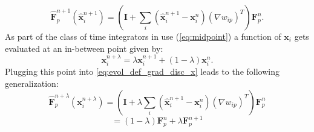 \documentclass[m,times]{cgMA}
\begin{document}
\begin{equation}\label{eq:evol_def_grad_disc_x}
  \boldsymbol{\hat{F}}^{n+1}_p(\boldsymbol{\hat{x}}_i^{n+1}) =  \left( \boldsymbol{I} + \sum_i (\boldsymbol{\hat{x}}_i^{n+1} - \boldsymbol{x}_i^{n})({\nabla w_{ip}})^T \right)\boldsymbol{F}^{n}_p.
\end{equation}
As part of the class of time integrators in use (\ref{eq:midpoint}) a function of $\boldsymbol{x}_i$ gets evaluated at an in-between point given by:
\begin{equation}\label{eq:midpoint_x}
  \boldsymbol{x}_i^{n+\lambda} = \lambda \boldsymbol{x}_i^{n+1} + (1-\lambda)\boldsymbol{x}_i^n.
\end{equation}
Plugging this point into \ref{eq:evol_def_grad_disc_x} leads to the following generalization:
$$\boldsymbol{\hat{F}}^{n+\lambda}_p(\boldsymbol{x}_i^{n+\lambda}) = \left( \boldsymbol{I} + \lambda \sum_i (\boldsymbol{\hat{x}}_i^{n+1} - \boldsymbol{x}_i^{n})({\nabla w_{ip}})^T \right)\boldsymbol{F}^{n}_p
  $$
  \begin{equation} \label{eq:def_grad_lambda}
  = (1-\lambda)\boldsymbol{F}^n_p + \lambda \boldsymbol{F}^{n+1}_p
\end{equation}
\begin{flushright}\cite{MPM:COURSE}\end{flushright}
\end{document}
